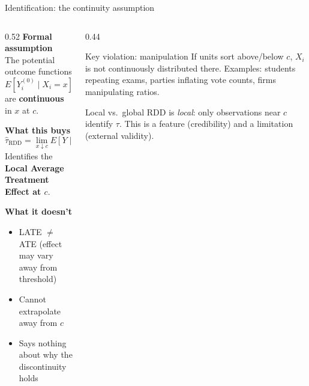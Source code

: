 \documentclass[aspectratio=169, 10pt]{beamer}
\begin{document}
\begin{frame}[shrink=5]{Identification: the continuity assumption}

  \begin{columns}[T]
    \begin{column}{0.52\textwidth}
      \textbf{Formal assumption}\\[4pt]
      The potential outcome functions
      \[
        E\!\left[Y_i^{(0)}\mid X_i=x\right] \text{ and }
        E\!\left[Y_i^{(1)}\mid X_i=x\right]
      \]
      are \textbf{continuous} in $x$ at $c$.

      \smallskip
      \textbf{What this buys}
      \[
        \hat\tau_{\text{RDD}} =
        \lim_{x\downarrow c} E[Y\mid X=x]
        - \lim_{x\uparrow c} E[Y\mid X=x]
      \]
      Identifies the \textbf{Local Average Treatment Effect at $c$}.

      \smallskip
      \textbf{What it doesn't}
      \begin{itemize}
        \item LATE $\neq$ ATE (effect may vary away from threshold)
        \item Cannot extrapolate away from $c$
        \item Says nothing about why the discontinuity holds
      \end{itemize}
    \end{column}
    \begin{column}{0.44\textwidth}
      \begin{alertblock}{Key violation: manipulation}\small
        If units sort above/below $c$, $X_i$ is not continuously
        distributed there. Examples: students repeating exams,
        parties inflating vote counts, firms manipulating ratios.
      \end{alertblock}

      \smallskip
      \begin{block}{Local vs.\ global}
        \small RDD is \emph{local}: only observations near $c$ identify
        $\tau$. This is a feature (credibility) and a limitation
        (external validity).
      \end{block}
    \end{column}
  \end{columns}

\end{frame}
\end{document}
